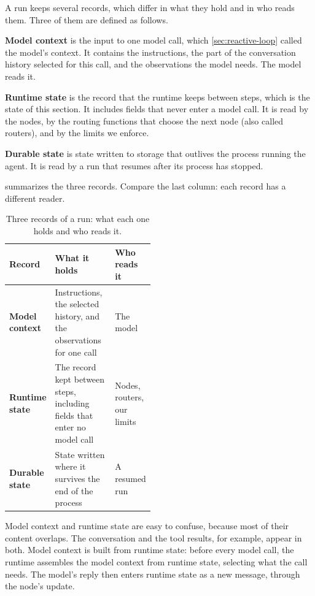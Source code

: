 A run keeps several records, which differ in what they hold and in who reads them. Three of them
are defined as follows.
\bi
\item \textbf{Model context} is the input to one model call, which \cref{sec:reactive-loop} called
the model's context. It contains the instructions, the part
of the conversation history selected for this call, and the observations the model needs. The model
reads it.
\item \textbf{Runtime state} is the record that the runtime keeps between steps, which is the state
of this section. It includes fields that never enter a model call. It is read by the nodes, by the
routing functions that choose the next node (also called routers), and by the limits we enforce.
\item \textbf{Durable state} is state written to storage that outlives the process running the
agent. It is read by a run that resumes after its process has stopped.
\ei

 summarizes the three records. Compare the last column: each record has a
different reader.

\begin{table}[htbp]
  \caption{Three records of a run: what each one holds and who reads it.}
  \label{tab:state-records}
  \begin{adjustbox}{width=\linewidth}\begin{tabularx}{\linewidth}{@{}L{0.21\linewidth}XL{0.26\linewidth}@{}}
    \toprule
    \textbf{Record} & \textbf{What it holds} & \textbf{Who reads it} \\
    \midrule
    \textbf{Model context} & Instructions, the selected history, and the observations for one call
      & The model \\
    \textbf{Runtime state} & The record kept between steps, including fields that enter no model
      call & Nodes, routers, our limits \\
    \textbf{Durable state} & State written where it survives the end of the process & A resumed
      run \\
    \bottomrule
  \end{tabularx}\end{adjustbox}
\end{table}

Model context and runtime state are easy to confuse, because most of their content overlaps. The
conversation and the tool results, for example, appear in both. Model context is built from runtime
state: before every model call, the runtime assembles the model context from runtime state,
selecting what the call needs. The model's reply then enters runtime state as a new message, through
the  node's update.

